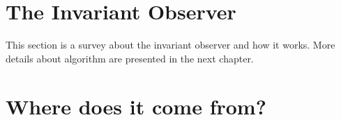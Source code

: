 



\section{The Invariant Observer } %
This section is a survey about the invariant observer and how it works.
More details about algorithm are presented in the next chapter. \newline

\newpage

\begin{tikztimingtable}[scale=1.75,timing/counter/new={char=Q,reset char=R}]


\end{tikztimingtable}


\section{Where does it come from?}  %
\label{section1.3}

